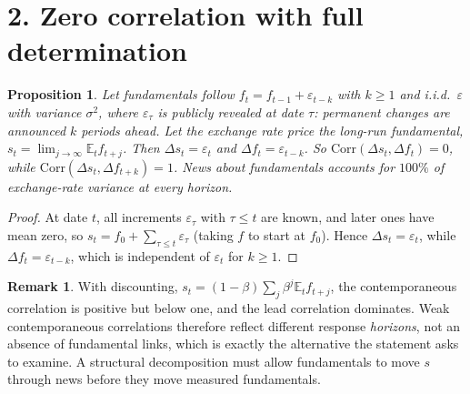 \documentclass[11pt]{article}
\newtheorem{proposition}[theorem]{Proposition}
\theoremstyle{definition}
\newtheorem{remark}[theorem]{Remark}
\begin{document}
\section*{2. Zero correlation with full determination}
\begin{proposition}\label{prop:news}
Let fundamentals follow $f_t=f_{t-1}+\varepsilon_{t-k}$ with $k\ge1$ and i.i.d.\ $\varepsilon$ with variance $\sigma^2$, where
$\varepsilon_\tau$ is publicly revealed at date $\tau$: permanent changes are announced $k$ periods ahead. Let the exchange rate
price the long-run fundamental, $s_t=\lim_{j\to\infty}\mathbb E_tf_{t+j}$. Then $\Delta s_t=\varepsilon_t$ and
$\Delta f_t=\varepsilon_{t-k}$. So $\mathrm{Corr}(\Delta s_t,\Delta f_t)=0$, while $\mathrm{Corr}(\Delta s_t,\Delta f_{t+k})=1$.
News about fundamentals accounts for $100\%$ of exchange-rate variance at every horizon.
\end{proposition}
\begin{proof}
At date $t$, all increments $\varepsilon_\tau$ with $\tau\le t$ are known, and later ones have mean zero, so
$s_t=f_0+\sum_{\tau\le t}\varepsilon_\tau$ (taking $f$ to start at $f_0$). Hence $\Delta s_t=\varepsilon_t$, while
$\Delta f_t=\varepsilon_{t-k}$, which is independent of $\varepsilon_t$ for $k\ge1$.
\end{proof}
\begin{remark}
With discounting, $s_t=(1-\beta)\sum_j\beta^j\mathbb E_tf_{t+j}$, the contemporaneous correlation is positive but below one,
and the lead correlation dominates. Weak contemporaneous correlations therefore reflect different response \emph{horizons}, not
an absence of fundamental links, which is exactly the alternative the statement asks to examine. A structural decomposition
must allow fundamentals to move $s$ through news before they move measured fundamentals.
\end{remark}
\end{document}
